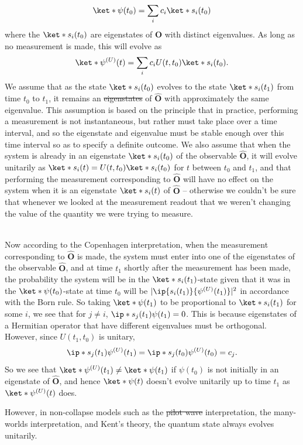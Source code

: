 \documentclass[12pt]{report}
\providecommand{\DIFadd}[1]{{\protect\color{blue}\uwave{#1}}} %
\providecommand{\DIFdel}[1]{{\protect\color{red}\sout{#1}}}                      %
\providecommand{\DIFaddbegin}{} %
\providecommand{\DIFaddend}{} %
\providecommand{\DIFdelbegin}{} %
\providecommand{\DIFdelend}{} %
\begin{document}
{  $$\ket*{\psi(t_0)}=\sum_i c_i\ket*{s_i(t_0)}$$
 where the $\ket*{s_i(t_0)}$ are eigenstates of $\hat{\bm{O}}$ with distinct eigenvalues. As long as no measurement is made, this will evolve as 
 $$\ket*{\psi^{(U)}(t)}=\sum_i c_iU(t,t_0)\ket*{s_i(t_0)}.$$  
 We assume that as the state $\ket*{s_i(t_0)}$ evolves to the state $\ket*{s_i(t_1)}$ from time $t_0$ to $t_1$, it remains an \DIFdelbegin \DIFdel{eigenstates }\DIFdelend \DIFaddbegin \DIFadd{eigenstate }\DIFaddend of $\hat{\bm{O}}$ with approximately the same eigenvalue. This assumption is based on the principle that in practice, performing a measurement is not instantaneous, but rather must take place over a time interval, and so the eigenstate and eigenvalue must be stable enough over this time interval so as to specify a definite outcome. We also assume that when the system is already in an eigenstate $\ket*{s_i(t_0)}$ of the observable $\hat{\bm{O}}$, it will evolve unitarily as $\ket*{s_i(t)}=U(t,t_0)\ket*{s_i(t_0)}$ for $t$ between $t_0$ and $t_1$, and that performing the measurement corresponding to $\hat{\bm{O}}$ will have no effect on the system when it is an eigenstate  $\ket*{s_i(t)}$ of $\hat{\bm{O}}$ -- otherwise we couldn't be sure that whenever we looked at the measurement readout that we weren't changing the value of the quantity we were trying to measure. \strut \\[\baselineskip]
Now according to the Copenhagen interpretation, when the measurement corresponding to $\hat{\bm{O}}$ is made, the system must enter into one of the eigenstates of the observable $\hat{\bm{O}}$, and at time $t_1$ shortly after the measurement has been made, the probability the system will be in the $\ket*{s_i(t_1)}$-state given that it was in the $\ket*{\psi(t_0)}$-state at time $t_0$ will be $|\ip{s_i(t_1)}{\psi^{(U)}(t_1)}|^2$ in accordance with the Born rule. So taking $\ket*{\psi(t_1)}$ to be proportional to $\ket*{s_i(t_1)}$ for some $i$, we see that for $j\neq i$, $\ip*{s_j(t_1)}{\psi(t_1)}=0$. This is because eigenstates of a Hermitian operator that have different eigenvalues must be orthogonal. However, since $U(t_1,t_0)$ is unitary,
 $$\ip*{s_j(t_1)}{\psi^{(U)}(t_1)}=\ip*{s_j(t_0)}{\psi^{(U)}(t_0)}=c_j.$$
 So we see that $\ket*{\psi^{(U)}(t_1)}\neq\ket*{\psi(t_1)}$ if $\psi(t_0)$ is not initially in an eigenstate of $\hat{\bm{O}}$, and hence $\ket*{\psi(t)}$ doesn't evolve unitarily up to time $t_1$ as $\ket*{\psi^{(U)}(t)}$ does.} However, in non-collapse models  such as the \DIFdelbegin \DIFdel{pilot wave }\DIFdelend \DIFaddbegin \DIFadd{Bohmian }\DIFaddend interpretation, the many-worlds interpretation, and Kent's theory, the quantum state always evolves unitarily. 
\end{document}
